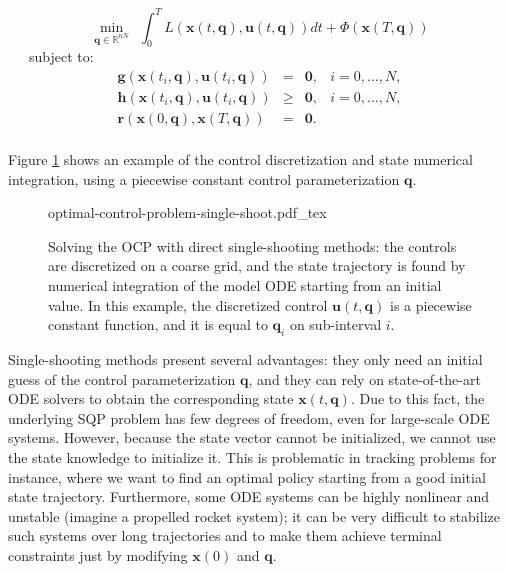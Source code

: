 \begin{equation}
  \min_{\mathbf{q}\in\mathbb R^{nN}} \ \ \int_{0}^{T}L (\mathbf{x}(t,\mathbf{q}),
  \mathbf{u}(t,\mathbf{q}))dt + \Phi(\mathbf{x}(T,\mathbf{q}))
\end{equation}
\ \ \ subject to:
\begin{equation}
  \begin{array}{rclr}
  \mathbf{g}(\mathbf{x}(t_i,\mathbf{q}), \mathbf{u}(t_i,\mathbf{q})) & = & \mathbf{0}, & i=0,\ldots,N,%
  \\%
  \mathbf{h}(\mathbf{x}(t_i,\mathbf{q}), \mathbf{u}(t_i,\mathbf{q})) & \ge & \mathbf{0}, & i=0,\ldots,N,%
  \\%
  \mathbf{r} (\mathbf{x}(0,\mathbf{q}), \mathbf{x}(T,\mathbf{q})) & = & \mathbf{0}.%
  \\%
  \end{array}
\end{equation} 

Figure \ref{fig:chap3-optimal-control-problem-single-shoot} shows an
example of the control discretization and state numerical integration,
using a piecewise constant control parameterization $\mathbf{q}$.

\begin{figure}
  \centering
      {\def\svgwidth{0.9\linewidth}
        
                   {optimal-control-problem-single-shoot.pdf_tex}
      }
      \caption{Solving the OCP with direct single-shooting methods:
        the controls are discretized on a coarse grid, and the state
        trajectory is found by numerical integration of the model ODE
        starting from an initial value. In this example, the
        discretized control $\mathbf{u}(t,\mathbf{q})$ is a piecewise
        constant function, and it is equal to $\mathbf{q}_i$ on
        sub-interval $i$.}
      \label{fig:chap3-optimal-control-problem-single-shoot}
\end{figure}

Single-shooting methods present several advantages: they only need an
initial guess of the control parameterization $\mathbf{q}$, and they
can rely on state-of-the-art ODE solvers to obtain the corresponding
state $\mathbf{x}(t,\mathbf{q})$. Due to this fact, the underlying SQP
problem has few degrees of freedom, even for large-scale ODE
systems. However, because the state vector cannot be initialized, we
cannot use the state knowledge to initialize it. This is problematic
in tracking problems for instance, where we want to find an optimal
policy starting from a good initial state trajectory. Furthermore,
some ODE systems can be highly nonlinear and unstable (imagine a
propelled rocket system); it can be very difficult to stabilize such
systems over long trajectories and to make them achieve terminal
constraints just by modifying $\mathbf{x}(0)$ and $\mathbf{q}$.

